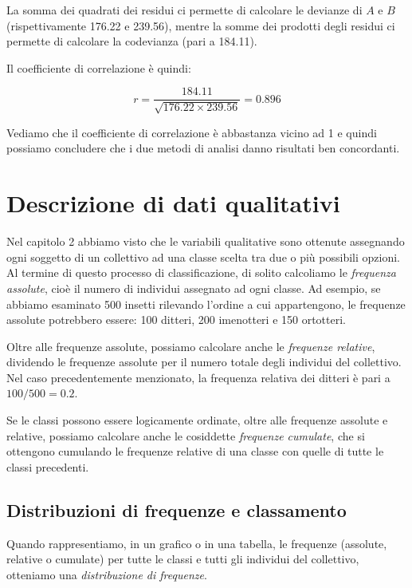 \documentclass[a4paper,12pt,oneside]{book}
\begin{document}
La somma dei quadrati dei residui ci permette di calcolare le devianze di \(A\) e \(B\) (rispettivamente 176.22 e 239.56), mentre la somme dei prodotti degli residui ci permette di calcolare la codevianza (pari a 184.11).

Il coefficiente di correlazione è quindi:

\[r = \frac{184.11}{\sqrt{176.22 \times 239.56}} = 0.896\]

Vediamo che il coefficiente di correlazione è abbastanza vicino ad 1 e quindi possiamo concludere che i due metodi di analisi danno risultati ben concordanti.

\hypertarget{descrizione-di-dati-qualitativi}{%
\section{Descrizione di dati qualitativi}\label{descrizione-di-dati-qualitativi}}

Nel capitolo 2 abbiamo visto che le variabili qualitative sono ottenute assegnando ogni soggetto di un collettivo ad una classe scelta tra due o più possibili opzioni. Al termine di questo processo di classificazione, di solito calcoliamo le \emph{frequenza assolute}, cioè il numero di individui assegnato ad ogni classe. Ad esempio, se abbiamo esaminato 500 insetti rilevando l'ordine a cui appartengono, le frequenze assolute potrebbero essere: 100 ditteri, 200 imenotteri e 150 ortotteri.

Oltre alle frequenze assolute, possiamo calcolare anche le \emph{frequenze relative}, dividendo le frequenze assolute per il numero totale degli individui del collettivo. Nel caso precedentemente menzionato, la frequenza relativa dei ditteri è pari a \(100/500 = 0.2\).

Se le classi possono essere logicamente ordinate, oltre alle frequenze assolute e relative, possiamo calcolare anche le cosiddette \emph{frequenze cumulate}, che si ottengono cumulando le frequenze relative di una classe con quelle di tutte le classi precedenti.

\hypertarget{distribuzioni-di-frequenze-e-classamento}{%
\subsection{Distribuzioni di frequenze e classamento}\label{distribuzioni-di-frequenze-e-classamento}}

Quando rappresentiamo, in un grafico o in una tabella, le frequenze (assolute, relative o cumulate) per tutte le classi e tutti gli individui del collettivo, otteniamo una \emph{distribuzione di frequenze}.
\end{document}
